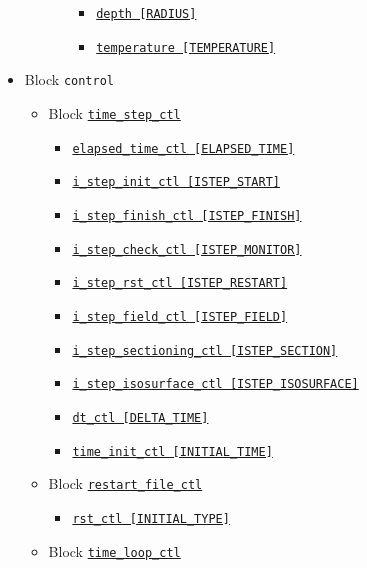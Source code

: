 \begin{itemize}
\begin{itemize}
\begin{itemize}
			\begin{itemize}
			\item \hyperref[href_t:depth]      {\tt depth        [RADIUS]}
			\item \hyperref[href_t:temperature]{\tt temperature  [TEMPERATURE]}
			\end{itemize}
		\end{itemize}
	\end{itemize}
%
\item Block \verb|control|
	\begin{itemize}
	\item Block \hyperref[href_t:time_step_ctl]{\tt time\_step\_ctl}
		\begin{itemize} \label{href_i:time_step_ctl}
		\item \hyperref[href_t:elapsed_time_ctl]
			{\tt elapsed\_time\_ctl        [ELAPSED\_TIME]}
		\item \hyperref[href_t:i_step_init_ctl]
			{\tt i\_step\_init\_ctl        [ISTEP\_START]}
		\item \hyperref[href_t:i_step_finish_ctl]
			{\tt i\_step\_finish\_ctl      [ISTEP\_FINISH]}
		\item \hyperref[href_t:i_step_check_ctl]
			{\tt i\_step\_check\_ctl       [ISTEP\_MONITOR]}
		\item \hyperref[href_t:i_step_rst_ctl]
			{\tt i\_step\_rst\_ctl         [ISTEP\_RESTART]}
		\item \hyperref[href_t:i_step_field_ctl]
			{\tt i\_step\_field\_ctl       [ISTEP\_FIELD]}
		\item \hyperref[href_t:i_step_sectioning_ctl]
			{\tt i\_step\_sectioning\_ctl  [ISTEP\_SECTION]}
		\item \hyperref[href_t:i_step_isosurface_ctl]
			{\tt i\_step\_isosurface\_ctl  [ISTEP\_ISOSURFACE]}
		\item \hyperref[href_t:dt_ctl]
			{\tt dt\_ctl                   [DELTA\_TIME]}
		\item \hyperref[href_t:time_init_ctl]
			{\tt time\_init\_ctl           [INITIAL\_TIME]}
		\end{itemize}
%
	\item Block \hyperref[href_t:restart_file_ctl]{\tt restart\_file\_ctl}
		\begin{itemize} \label{href_i:restart_file_ctl}
		\item \hyperref[href_t:rst_ctl]{\tt rst\_ctl      [INITIAL\_TYPE]}
		\end{itemize}
%
	\item Block \verb||
    		\hyperref[href_t:time_loop_ctl]{\tt time\_loop\_ctl}

\end{itemize}
\end{itemize}

